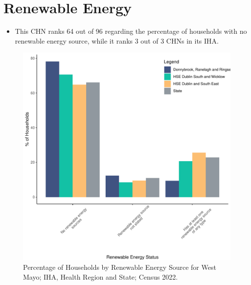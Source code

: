 \documentclass{article}
\begin{document}
\section{Renewable Energy}\label{sect:RE}
\begin{itemize}
\item This CHN ranks  64 out of 96 regarding the percentage of households with no renewable energy source, while it ranks   3 out of 3 CHNs in its IHA.
\end{itemize}
\begin{figure}[H]
	\centering
	\includegraphics[width = 140mm]{../figures/RenewableEnergyED.pdf}
	\caption{Percentage of Households by Renewable Energy Source for West Mayo; IHA, Health Region and State; Census 2022.}
	\label{fig:vbnv}
	\end{figure}
\end{document}

